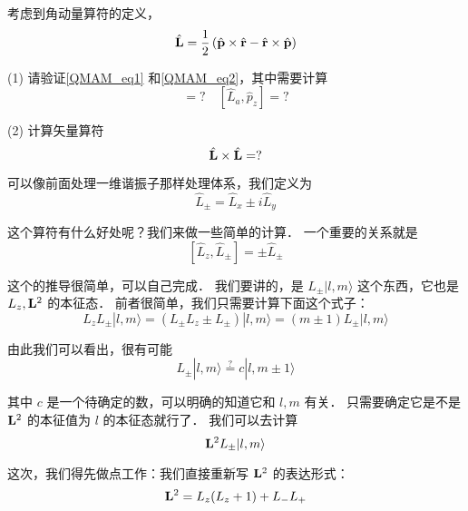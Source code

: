 \begin{exer}{}
考虑到角动量算符的定义，
\begin{equation}
{\hat{\bf L}} = \displaystyle\frac{1}{2}\left({\hat{\bf p}}\times {\hat{\bf r}} - {\hat{\bf r}}\times {\hat{\bf p}}\right)
\end{equation}

(1) 请验证\autoref{QMAM_eq1} 和\autoref{QMAM_eq2}，其中需要计算
\begin{equation}
[\hat L_a, \hat r_b] = ? \quad [\hat L_a, \hat p_z] = ? 
\end{equation}

(2) 计算矢量算符
\begin{equation}
\hat{\bf L}\times \hat{\bf L} = ?
\end{equation}
\end{exer}

可以像前面处理一维谐振子那样处理体系，我们定义为
\begin{equation}
\hat L_{\pm} = \hat L_x \pm i\hat L_y
\end{equation}

这个算符有什么好处呢？我们来做一些简单的计算． 一个重要的关系就是
\begin{equation}\label{QMAM_eq10}
[\hat L_z, \hat L_{\pm}] = \pm \hat L_{\pm}
\end{equation}

这个的推导很简单，可以自己完成． 我们要讲的，是 $L_{\pm}|l,m\rangle$ 这个东西，它也是 $L_z, {\bf L}^2$ 的本征态． 前者很简单，我们只需要计算下面这个式子：
\begin{equation}
L_z L_{\pm}|l,m\rangle = (L_{\pm}L_z \pm L_{\pm})|l,m\rangle = (m\pm 1)L_{\pm}|l,m\rangle
\end{equation}

由此我们可以看出，很有可能
\begin{equation}
L_{\pm}|l,m\rangle \overset{?}{=} c|l,m\pm1\rangle
\end{equation}

其中 $c$ 是一个待确定的数，可以明确的知道它和 $l,m$ 有关． 只需要确定它是不是 ${\bf L}^2$ 的本征值为 $l$ 的本征态就行了． 我们可以去计算
\begin{equation}
{\bf L}^2L_{\pm}|l,m\rangle
\end{equation}

这次，我们得先做点工作：我们直接重新写 ${\bf L}^2$ 的表达形式：
\begin{equation}
{\bf L}^2 = L_z(L_z+1)+L_-L_+
\end{equation}

